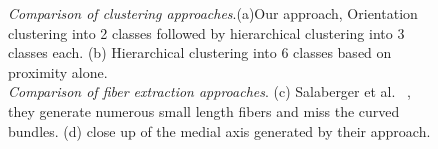 \begin{figure}[h]
\centering
{}


   \caption{\textit{Comparison of clustering approaches}.(a)Our approach,  Orientation clustering into 2 classes followed by hierarchical clustering into 3 classes each. (b) Hierarchical clustering into 6 classes based on proximity alone.\\
   \textit{Comparison of fiber extraction approaches}. (c) Salaberger et al. ~\cite{Salaberger2011}, they generate numerous small length fibers and miss the curved bundles. (d) close up of the medial axis generated by their approach.}\label{fig:compare-3}
\end{figure}

